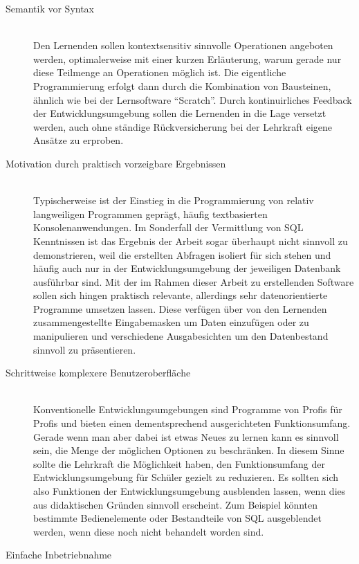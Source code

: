 \begin{description}
\item[Semantik vor Syntax] \hfill\\
  Den Lernenden sollen kontextsensitiv sinnvolle Operationen angeboten werden, optimalerweise mit einer kurzen Erläuterung, warum gerade nur diese Teilmenge an Operationen möglich ist. Die eigentliche Programmierung erfolgt dann durch die Kombination von Bausteinen, ähnlich wie bei der Lernsoftware ``Scratch''. Durch kontinuirliches Feedback der Entwicklungsumgebung sollen die Lernenden in die Lage versetzt werden, auch ohne ständige Rückversicherung bei der Lehrkraft eigene Ansätze zu erproben.
\item[Motivation durch praktisch vorzeigbare Ergebnissen] \hfill\\
  Typischerweise ist der Einstieg in die Programmierung von relativ langweiligen Programmen geprägt, häufig textbasierten Konsolenanwendungen. Im Sonderfall der Vermittlung von SQL Kenntnissen ist das Ergebnis der Arbeit sogar überhaupt nicht sinnvoll zu demonstrieren, weil die erstellten Abfragen isoliert für sich stehen und häufig auch nur in der Entwicklungsumgebung der jeweiligen Datenbank ausführbar sind. Mit der im Rahmen dieser Arbeit zu erstellenden Software sollen sich hingen praktisch relevante, allerdings sehr datenorientierte Programme umsetzen lassen. Diese verfügen über von den Lernenden zusammengestellte Eingabemasken um Daten einzufügen oder zu manipulieren und verschiedene Ausgabesichten um den Datenbestand sinnvoll zu präsentieren.
\item[Schrittweise komplexere Benutzeroberfläche] \hfill \\
  Konventionelle Entwicklungsumgebungen sind Programme von Profis für Profis und bieten einen dementsprechend ausgerichteten Funktionsumfang. Gerade wenn man aber dabei ist etwas Neues zu lernen kann es sinnvoll sein, die Menge der möglichen Optionen zu beschränken. In diesem Sinne sollte die Lehrkraft die Möglichkeit haben, den Funktionsumfang der Entwicklungsumgebung für Schüler gezielt zu reduzieren. Es sollten sich also Funktionen der Entwicklungsumgebung ausblenden lassen, wenn dies aus didaktischen Gründen sinnvoll erscheint. Zum Beispiel könnten bestimmte Bedienelemente oder Bestandteile von SQL ausgeblendet werden, wenn diese noch nicht behandelt worden sind.
\item[Einfache Inbetriebnahme] \hfill \\

\end{description}
